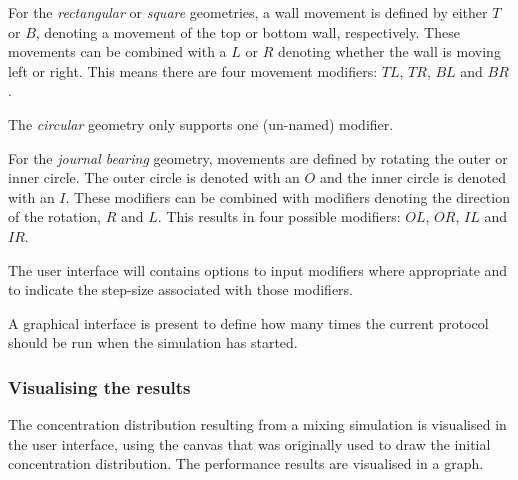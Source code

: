 \fpstartparagraph{} For the \emph{rectangular} or \emph{square} geometries, a wall movement is defined by either $T$ or $B$, denoting a movement of the top or bottom wall, respectively. These movements can be combined with a $L$ or $R$ denoting whether the wall is moving left or right. This means there are four movement modifiers: $TL$, $TR$, $BL$ and $BR$. 

The \emph{circular} geometry only supports one (un-named) modifier.

For the \emph{journal bearing} geometry, movements are defined by rotating the outer or inner circle. The outer circle is denoted with an $O$ and the inner circle is denoted with an $I$. These modifiers can be combined with modifiers denoting the direction of the rotation, $R$ and $L$. This results in four possible modifiers: $OL$, $OR$, $IL$ and $IR$.

The user interface will contains options to input modifiers where appropriate and to indicate the step-size associated with those modifiers.

\fpstartparagraph{} A graphical interface is present to define how many times the current protocol should be run when the simulation has started.







\subsubsection{Visualising the results}
The concentration distribution resulting from a mixing simulation is visualised in the user interface, using the canvas that was originally used to draw the initial concentration distribution. The performance results are visualised in a graph.

